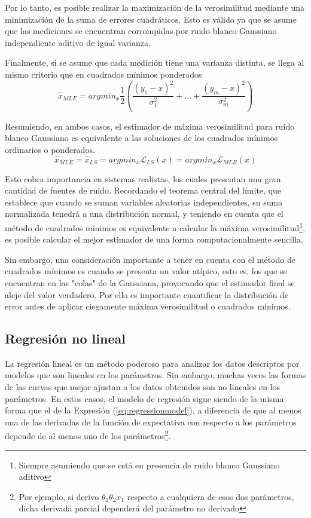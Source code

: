 Por lo tanto, es posible realizar la maximización de la verosimilitud mediante una minimización de la suma de errores cuadráticos. Esto es válido ya que se asume que las mediciones se encuentran corrompidas por ruido blanco Gaussiano independiente aditivo de igual varianza.

Finalmente, si se asume que cada medición tiene una varianza distinta, se llega al mismo criterio que en cuadrados mínimos ponderados
\begin{equation}
    \hat{x}_{MLE} = argmin_x \frac{1}{2}\left(\frac{(y_1-x)^2}{\sigma_1^2}+...+\frac{(y_m-x)^2}{\sigma_m^2}\right)
\end{equation}

Resumiendo, en ambos casos, el estimador de máxima verosimilitud para ruido blanco Gaussiano es equivalente a las soluciones de los cuadrados mínimos ordinarios o ponderados.
\begin{equation}
    \hat{x}_{MLE} = \hat{x}_{LS} = argmin_x\mathscr{L}_{LS}(x) = argmin_x\mathscr{L}_{MLE}(x)
\end{equation}

Esto cobra importancia en sistemas realistas, los cuales presentan una gran cantidad de fuentes de ruido. Recordando el teorema central del límite, que establece que cuando se suman variables aleatorias independientes, su suma normalizada tenedrá a una distribución normal, y teniendo en cuenta que el método de cuadrados mínimos es equivalente a calcular la máxima verosimilitud\footnote{Siempre asumiendo que se está en presencia de ruido blanco Gaussiano aditivo}, es posible calcular el mejor estimador de una forma computacionalmente sencilla.

Sin embargo, una consideración importante a tener en cuenta con el método de cuadrados mínimos es cuando se presenta un valor atípico, esto es, los que se encuentran en las "colas" de la Gaussiana, provocando que el estimador final se aleje del valor verdadero. Por ello es importante cuantificar la distribución de error antes de aplicar ciegamente máxima verosimilitud o cuadrados mínimos.

\subsection{Regresión no lineal}

La regresión lineal es un método poderoso para analizar los datos descriptos por modelos que son lineales en los parámetros. Sin embargo, muchas veces las formas de las curvas que mejor ajustan a los datos obtenidos son no lineales en los parámetros. En estos casos, el modelo de regresión sigue siendo de la misma forma que el de la Expresión (\ref{eq:regressionmodel}), a diferencia de que al menos una de las derivadas de la función de expectativa con respecto a los parámetros depende de al menos uno de los parámetros\footnote{Por ejemplo, si derivo $\theta_1 \theta_2 x_1$ respecto a cualquiera de esos dos parámetros, dicha derivada parcial dependerá del parámetro no derivado}.

